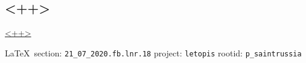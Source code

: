  
 
\subsection{<++>}
\url{<++>}
  
\vspace{0.5cm}
{\small\LaTeX~section: \verb|21_07_2020.fb.lnr.18| project: \verb|letopis| rootid: \verb|p_saintrussia|}
\vspace{0.5cm}
  
